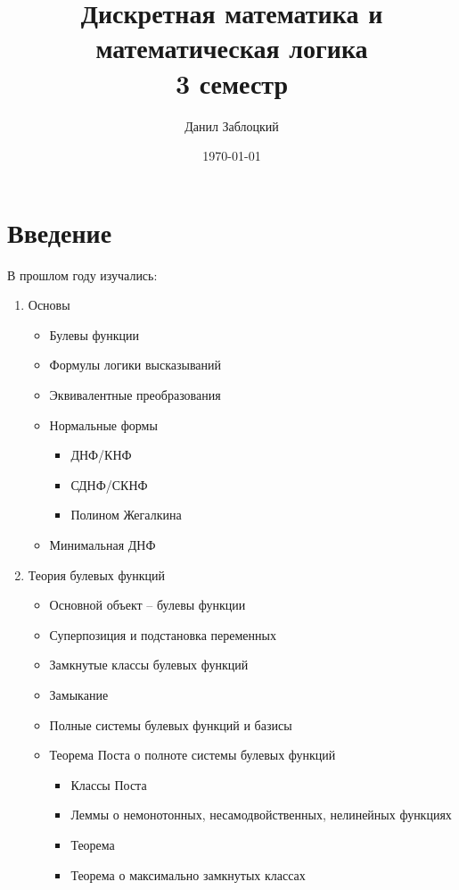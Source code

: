 \documentclass{report}
\title{Дискретная математика и математическая логика \\ 3 семестр}
\author{Данил Заблоцкий}
\date{\today}
\theoremstyle{definition}
\begin{document}
\maketitle
\tableofcontents
\chapter*{Введение}

В прошлом году изучались:
\begin{enumerate}
    \item Основы
          \begin{itemize}
              \item Булевы функции
              \item Формулы логики высказываний
              \item Эквивалентные преобразования
              \item Нормальные формы
                    \begin{itemize}
                        \item ДНФ/КНФ
                        \item СДНФ/СКНФ
                        \item Полином Жегалкина
                    \end{itemize}
              \item Минимальная ДНФ
          \end{itemize}
    \item Теория булевых функций
          \begin{itemize}
              \item Основной объект -- булевы функции
              \item Суперпозиция и подстановка переменных
              \item Замкнутые классы булевых функций
              \item Замыкание
              \item Полные системы булевых функций и базисы
              \item Теорема Поста о полноте системы булевых функций
                    \begin{itemize}
                        \item Классы Поста
                        \item Леммы о немонотонных, несамодвойственных, нелинейных функциях
                        \item Теорема
                        \item Теорема о максимально замкнутых классах

\end{itemize}
\end{itemize}
\end{enumerate}
\end{document}
